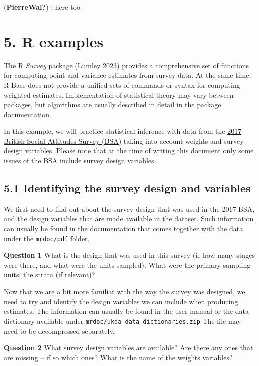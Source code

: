 \documentclass[
  14,
  a4paper,
  DIV=11,
  numbers=noendperiod]{scrartcl}
\begin{document}
(\textbf{PierreWal?}) : here too

\hypertarget{r-examples}{%
\section{5. R examples}\label{r-examples}}

The R \emph{Survey} package (Lumley 2023) provides a comprehensive set
of functions for computing point and variance estimates from survey
data. At the same time, R Base does not provide a unified sets of
commands or syntax for computing weighted estimates. Implementation of
statistical theory may vary between packages, but algorithms are usually
described in detail in the package documentation.

In this example, we will practice statistical inference with data from
the
\href{https://beta.ukdataservice.ac.uk/datacatalogue/studies/study?id=8450}{2017
British Social Attitudes Survey (BSA)} taking into account weights and
survey design variables. Please note that at the time of writing this
document only some issues of the BSA include survey design variables.

\hypertarget{identifying-the-survey-design-and-variables}{%
\subsection{5.1 Identifying the survey design and
variables}\label{identifying-the-survey-design-and-variables}}

We first need to find out about the survey design that was used in the
2017 BSA, and the design variables that are made available in the
dataset. Such information can usually be found in the documentation that
comes together with the data under the \texttt{mrdoc/pdf} folder.

\textbf{Question 1} What is the design that was used in this survey (ie
how many stages were there, and what were the units sampled). What were
the primary sampling units; the strata (if relevant)?

Now that we are a bit more familiar with the way the survey was
designed, we need to try and identify the design variables we can
include when producing estimates. The information can usually be found
in the user manual or the data dictionary available under
\texttt{mrdoc/ukda\_data\_dictionaries.zip} The file may need to be
decompressed separately.

\textbf{Question 2} What survey design variables are available? Are
there any ones that are missing -- if so which ones? What is the name of
the weights variables?
\end{document}
